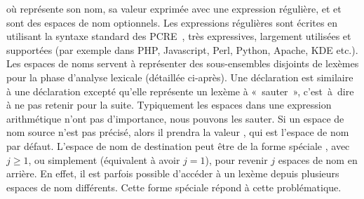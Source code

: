 \begin{pre}
\end{pre}
%
où  représente son nom,  sa valeur exprimée avec une
expression régulière, et  et  sont des espaces
de nom optionnels. Les expressions régulières sont écrites en utilisant la
syntaxe standard des PCRE~, très expressives, largement utilisées
et supportées (par exemple dans PHP, Javascript, Perl, Python, Apache, KDE
etc.). Les espaces de noms servent à représenter des sous-ensembles disjoints de
lexèmes pour la phase d'analyse lexicale (détaillée ci-après). Une déclaration
 est similaire à une déclaration  excepté qu'elle
représente un lexème à «~sauter~», c'est~à~dire à ne pas retenir pour la suite.
Typiquement les espaces dans une expression arithmétique n'ont pas d'importance,
nous pouvons les sauter. Si un espace de nom source n'est pas précisé, alors il
prendra la valeur , qui est l'espace de nom par défaut. L'espace
de nom de destination peut être de la forme spéciale ,
avec $j \geq 1$, ou simplement  (équivalent à avoir $j =
1$), pour revenir $j$ espaces de nom en arrière. En effet, il est parfois
possible d'accéder à un lexème depuis plusieurs espaces de nom différents. Cette
forme spéciale répond à cette problématique. \\

